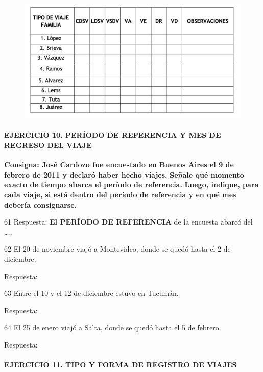 \documentclass[
  openany]{book}
\begin{document}
\begin{figure}

{\centering \includegraphics[width=1\linewidth]{imagenes/figura6-148} 

}

\end{figure}

\hypertarget{ejercicio-10.-peruxedodo-de-referencia-y-mes-de-regreso-del-viaje}{%
\paragraph{\texorpdfstring{\textbf{EJERCICIO 10. PERÍODO DE REFERENCIA Y MES DE REGRESO DEL VIAJE}}{EJERCICIO 10. PERÍODO DE REFERENCIA Y MES DE REGRESO DEL VIAJE}}\label{ejercicio-10.-peruxedodo-de-referencia-y-mes-de-regreso-del-viaje}}

\textbf{Consigna: José Cardozo fue encuestado en Buenos Aires el 9 de febrero de 2011 y declaró haber hecho viajes.} \textbf{Señale qué momento exacto de tiempo abarca el período de referencia.} \textbf{Luego, indique, para cada viaje, si está dentro del período de referencia y en qué mes debería consignarse.}

61 Respuesta: \textbf{El PERÍODO DE REFERENCIA} de la encuesta abarcó del \ldots..

62 El 20 de noviembre viajó a Montevideo, donde se quedó hasta el 2 de diciembre.

Respuesta:

63 Entre el 10 y el 12 de diciembre estuvo en Tucumán.

Respuesta:

64 El 25 de enero viajó a Salta, donde se quedó hasta el 5 de febrero.

Respuesta:

\hypertarget{ejercicio-11.-tipo-y-forma-de-registro-de-viajes}{%
\paragraph{\texorpdfstring{\textbf{EJERCICIO 11. TIPO Y FORMA DE REGISTRO DE VIAJES}}{EJERCICIO 11. TIPO Y FORMA DE REGISTRO DE VIAJES}}\label{ejercicio-11.-tipo-y-forma-de-registro-de-viajes}}
\end{document}
